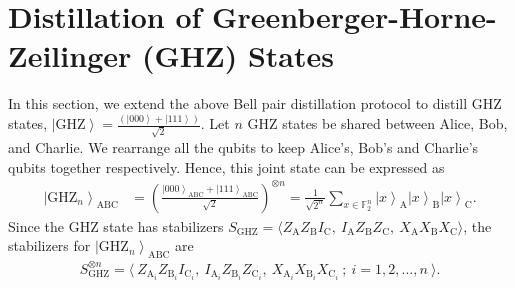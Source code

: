 \documentclass[journal,onecolumn]{IEEEtran}
\newcommand{\dket}[1]{\left\lvert #1 \right\rangle}
\newif\ifnotes
\newcommand{\ankur}[1]{\ifnotes{{\color{red} [Ankur: #1]}}\fi}
\begin{document}
 







\section{Distillation of Greenberger-Horne-Zeilinger (GHZ) States}
\label{sec:ghz_distillation}

In this section, we extend the above Bell pair distillation protocol to distill GHZ states, $\dket{\text{GHZ}} = \frac{(\dket{000} + \dket{111})}{\sqrt{2}}$.
Let $n$ GHZ states be shared between Alice, Bob, and Charlie. 
We rearrange all the qubits to keep Alice's, Bob's and Charlie's qubits together respectively. 
Hence, this joint state can be expressed as
%
\begin{align}    
\label{eq:ghz_state_rearranged}
\dket{\text{GHZ}_n}_{\text{ABC}} & = \left(\frac{\dket{000}_{\text{ABC}} + \dket{111}_{\text{ABC}}}{\sqrt{2}}\right)^{\otimes n} = \frac{1}{\sqrt{2^n}} \sum_{x \in \mathbb{F}_2^n} \dket{x}_{\text{A}} \dket{x}_{\text{B}} \dket{x}_{\text{C}}. 
\end{align}
Since the GHZ state has stabilizers $S_{\text{GHZ}} = \langle Z_{\text{A}} Z_{\text{B}} I_{\text{C}}, \ I_{\text{A}} Z_{\text{B}} Z_{\text{C}}, \ X_{\text{A}} X_{\text{B}} X_{\text{C}} \rangle$, the stabilizers for $\dket{\text{GHZ}_n}_{\text{ABC}}$ are
\begin{align}
\label{eq:ghz_n_stabilizers}
S_{\text{GHZ}}^{\otimes n} = \langle \ Z_{\text{A}_i} Z_{\text{B}_i} I_{\text{C}_i}, \ I_{\text{A}_i} Z_{\text{B}_i} Z_{\text{C}_i}, \ X_{\text{A}_i} X_{\text{B}_i} X_{\text{C}_i} \ ; \ i = 1,2,\ldots,n \ \rangle.
\end{align}
\end{document}
